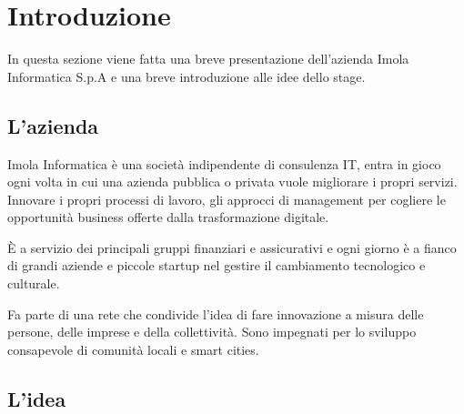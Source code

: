 
\chapter{Introduzione}\label{ch:introduzione}

In questa sezione viene fatta una breve presentazione dell'azienda Imola Informatica S.p.A e una breve introduzione alle idee dello stage.
%
%

\section{L'azienda}\label{sec:l'azienda}

Imola Informatica è una società indipendente di consulenza IT, entra in gioco ogni volta in cui una azienda pubblica o privata vuole migliorare i propri servizi. Innovare i propri processi di lavoro, gli approcci di management per cogliere le opportunità business offerte dalla trasformazione digitale.

È a servizio dei principali gruppi finanziari e assicurativi e ogni giorno è a fianco di grandi aziende e piccole startup nel gestire il cambiamento tecnologico e culturale.

Fa parte di una rete che condivide l’idea di fare innovazione a misura delle persone, delle imprese e della collettività. Sono impegnati per lo sviluppo consapevole di comunità locali e smart cities.

\section{L'idea}\label{sec:l'idea}

